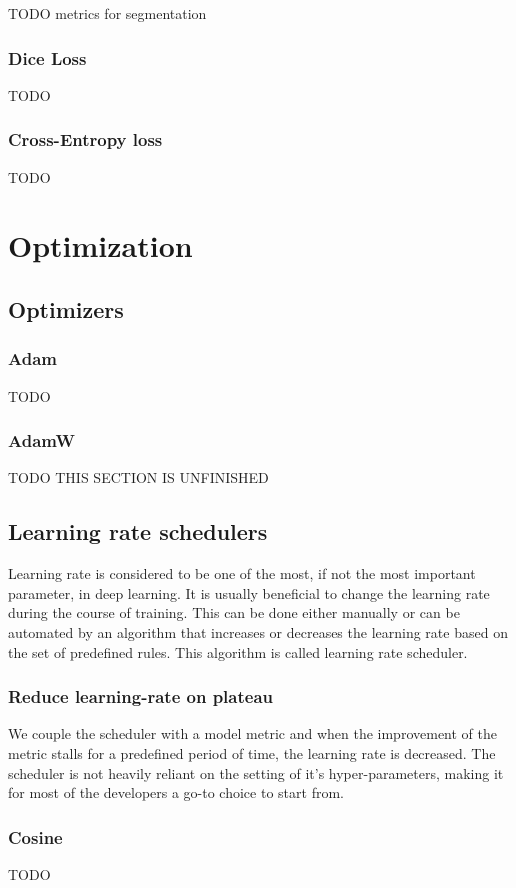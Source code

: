 TODO metrics for segmentation
\subsubsection{Dice Loss}
TODO

\subsubsection{Cross-Entropy loss}
TODO


\section{Optimization}
\subsection{Optimizers}
\subsubsection{Adam}
TODO
\subsubsection{AdamW}
TODO
THIS SECTION IS UNFINISHED

\subsection{Learning rate schedulers}
Learning rate is considered to be one of the most, if not the most important parameter, in deep learning. It is usually beneficial to change the learning rate during the course of training. This can be done either manually or can be automated by an algorithm that increases or decreases the learning rate based on the set of predefined rules. This algorithm is called learning rate scheduler.

\subsubsection{Reduce learning-rate on plateau}
We couple the scheduler with a model metric and when the improvement of the metric stalls for a predefined period of time, the learning rate is decreased.
The scheduler is not heavily reliant on the setting of it's hyper-parameters, making it for most of the developers a go-to choice to start from.
\subsubsection{Cosine }
TODO

